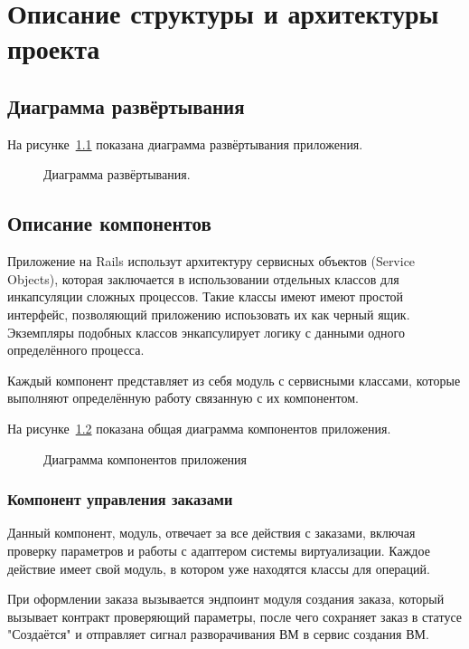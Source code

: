 \chapter{Описание структуры и архитектуры проекта}\label{ch:ch4}
\section{Диаграмма развёртывания}\label{sec:ch4/sect1}
На рисунке~\ref{fig:overview_components_diagram} показана диаграмма развёртывания приложения.
\begin{figure}[ht]
  \caption{Диаграмма развёртывания.}\label{fig:overview_components_diagram}
\end{figure}

\section{Описание компонентов}\label{sec:ch4/sect2}
Приложение на Rails использут архитектуру сервисных объектов (Service Objects), которая заключается в использовании отдельных классов для инкапсуляции сложных процессов. Такие классы имеют имеют простой интерфейс, позволяющий приложению испоьзовать их как черный ящик. Экземпляры подобных классов энкапсулирует логику с данными одного определённого процесса.


Каждый компонент представляет из себя модуль с сервисными классами, которые выполняют определённую работу связанную с их компонентом.


На рисунке~\ref{fig:application_scheme} показана общая диаграмма компонентов приложения.
\begin{figure}[ht]
  \caption{Диаграмма компонентов приложения}\label{fig:application_scheme}
\end{figure}

\subsection{Компонент управления заказами}\label{sec:subs1}
Данный компонент, модуль, отвечает за все действия с заказами, включая проверку параметров и работы с адаптером системы виртуализации.
Каждое действие имеет свой модуль, в котором уже находятся классы для операций.

При оформлении заказа вызывается эндпоинт модуля создания заказа, который вызывает контракт проверяющий параметры, после чего сохраняет заказ в статусе "Создаётся" и отправляет сигнал разворачивания ВМ в сервис создания ВМ.

